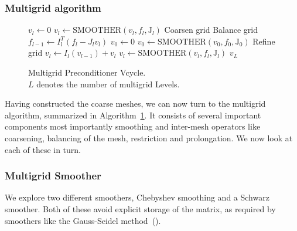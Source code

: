 %
%

\subsubsection{Multigrid algorithm}
\begin{figure}
  \begin{algorithm}[H]
    \caption{\label{alg:Multigrid_Vcycle}
      Multigrid Preconditioner Vcycle.\\
      $L$ denotes the number of multigrid Levels.}
    \begin{algorithmic}[1]
      \State $v_l \leftarrow 0$
      \State $v_l \leftarrow \text{SMOOTHER}(v_l,f_l,\mathrm{J}_l)$ 
      \State Coarsen grid
      \State Balance grid
      \State $f_{l-1} \leftarrow I_l^T(f_l - J_lv_l)$ 
      \EndFor
      \State $v_0 \leftarrow 0$
      \State $v_0 \leftarrow \text{SMOOTHER}(v_0,f_0,\mathrm{J}_0)$ 
      \State Refine grid
      \State $v_l \leftarrow I_l(v_{l-1}) + v_{l}$ 
      \State $v_l \leftarrow \text{SMOOTHER}(v_l,f_l,\mathrm{J}_l)$ 
      \EndFor
      \State \Return $v_L$
      \EndFunction
    \end{algorithmic}
  \end{algorithm}
\end{figure}
%
Having constructed the coarse meshes, we can now turn to the
  multigrid algorithm, summarized in
  Algorithm~\ref{alg:Multigrid_Vcycle}.  It consists of several
  important components most importantly smoothing and inter-mesh operators like coarsening,  balancing of the mesh, restriction and prolongation. We now look
  at each of these in turn.
%
\subsubsection{Multigrid Smoother}
%
We explore two different smoothers, Chebyshev smoothing and a Schwarz smoother.  Both of these avoid explicit storage of the matrix, as required by smoothers like the Gauss-Seidel method~(\citet*{shang2009distributed}).

